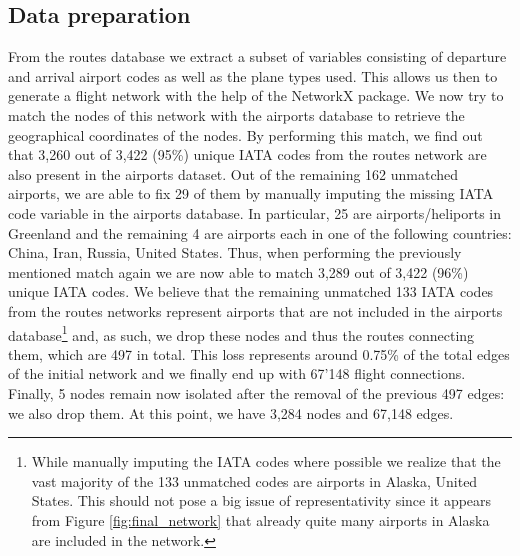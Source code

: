 \documentclass{Template resources/netsci-project}
\begin{document}
\subsection{Data preparation}
From the routes database we extract a subset of variables consisting of departure and arrival airport codes as well as the plane types used. This allows us then to generate a flight network with the help of the NetworkX package. We now try to match the nodes of this network with the airports database to retrieve the geographical coordinates of the nodes. By performing this match, we find out that 3,260 out of 3,422 (95\%) unique IATA codes from the routes network are also present in the airports dataset. Out of the remaining 162 unmatched airports, we are able to fix 29 of them by manually imputing the missing IATA code variable in the airports database. In particular, 25 are airports/heliports in Greenland and the remaining 4 are airports each in one of the following countries: China, Iran, Russia, United States. Thus, when performing the previously mentioned match again we are now able to match 3,289 out of 3,422 (96\%) unique IATA codes. We believe that the remaining unmatched 133 IATA codes from the routes networks represent airports that are not included in the airports database\footnote{While manually imputing the IATA codes where possible we realize that the vast majority of the 133 unmatched codes are airports in Alaska, United States. This should not pose a big issue of representativity since it appears from Figure \ref{fig:final_network} that already quite many airports in Alaska are included in the network.} and, as such, we drop these nodes and thus the routes connecting them, which are 497 in total. This loss represents around 0.75\% of the total edges of the initial network and we finally end up with 67’148 flight connections. Finally, 5 nodes remain now isolated after the removal of the previous 497 edges: we also drop them. At this point, we have 3,284 nodes and 67,148 edges. \\
\end{document}
